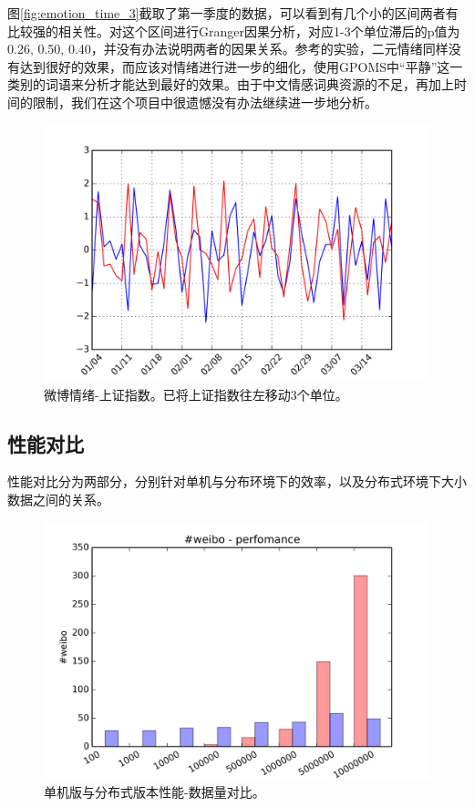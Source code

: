 \documentclass[12pt, oneside]{article}
\begin{document}
\begin{spacing}{1.5}
\begin{CJK}{UTF8}{gbsn}
图\ref{fig:emotion_time_3}截取了第一季度的数据，可以看到有几个小的区间两者有比较强的相关性。对这个区间进行Granger因果分析，对应1-3个单位滞后的p值为0.26, 0.50, 0.40，并没有办法说明两者的因果关系。参考\cite{bollen2011twitter}的实验，二元情绪同样没有达到很好的效果，而应该对情绪进行进一步的细化，使用GPOMS中“平静”这一类别的词语来分析才能达到最好的效果。由于中文情感词典资源的不足\cite{deng2014}，再加上时间的限制，我们在这个项目中很遗憾没有办法继续进一步地分析。

\begin{figure}
	\centering
	\includegraphics[width=0.8\linewidth]{../result/charts/emotion_price_offset3}
	\caption{微博情绪-上证指数。已将上证指数往左移动3个单位。}
	\label{fig:emotion_stock}
\end{figure}

\subsection{性能对比}
性能对比分为两部分，分别针对单机与分布环境下的效率，以及分布式环境下大小数据之间的关系。

\begin{figure}
	\centering
	\includegraphics[width=0.8\linewidth]{../result/charts/performance}
	\caption{单机版与分布式版本性能-数据量对比。}
	\label{fig:performance}
\end{figure}


\end{CJK}
\end{spacing}
\end{document}
